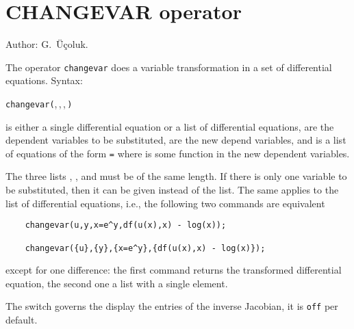 \section{CHANGEVAR operator}
\hypertarget{operator:CHANGEVAR}{}

\noindent
Author: G.~\"{U}\c{c}oluk.

The operator \texttt{changevar} does a variable transformation in a set of
differential equations.
Syntax:
\begin{syntaxtable}
  \texttt{changevar(},\,,\,,\,\texttt{)}
\end{syntaxtable}
 is either a single differential equation or a list of
differential equations,  are the dependent variables to
be substituted,  are the new depend variables, and
 is a list of equations of the form 
\texttt{=}  where  is some function
in the new dependent variables.

The three lists , , and  must
be of the same length. If there is only one variable to be
substituted, then it can be given instead of the list. The same applies to the list
of differential equations, i.e., the following two
commands are equivalent
\begin{verbatim}
    changevar(u,y,x=e^y,df(u(x),x) - log(x));

    changevar({u},{y},{x=e^y},{df(u(x),x) - log(x)});
\end{verbatim}
except for one difference: the first command returns the transformed differential
equation, the second one a list with a single element.

\hypertarget{switch:DISPJACOBIAN}{}
The switch  governs the display the entries of the inverse Jacobian,
it is \texttt{off} per default.

